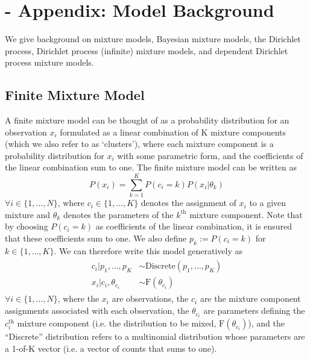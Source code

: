 \documentclass[twocolumn, final]{svjour3}
\begin{document}

\appendix

\newpage

\section{-  Appendix: Model Background}
\label{sec:modelbackground}

We give background on mixture models, Bayesian mixture models, the Dirichlet process, Dirichlet process (infinite) mixture models, and dependent Dirichlet process mixture models.


\subsection{Finite Mixture Model}
\label{sec:finitemixture}

A finite mixture model can be thought of as a probability distribution for an observation $x_{i}$ formulated as a linear combination of K mixture components (which we also refer to as `clusters'), where each mixture component is a probability distribution for $x_{i}$ with some parametric form, and the coefficients of the linear combination sum to one. The finite mixture model can be written as
\begin{equation}
P(x_{i}) = \sum_{k=1}^{K} P(c_{i} = k)P(x_{i}|\theta_{k})
\end{equation}
$\forall i \in \{ 1, \ldots, N \}$, where $c_{i} \in \{ 1, \ldots, K \}$ denotes the assignment of $x_{i}$ to a given mixture and $\theta_{k}$ denotes the parameters of the $k^{\text{th}}$ mixture component. Note that by choosing $P(c_{i} = k)$ as coefficients of the linear combination, it is ensured that these coefficients sum to one. We also define $p_{k} := P(c_{i} = k)$ for $k \in \{ 1, \ldots, K \} $. We can therefore write this model generatively as
\begin{align}
\begin{split}
  c_{i}|p_{1}, \ldots, p_{K}  &\sim  \text{Discrete}(p_{1}, \ldots, p_{K}) \\
  x_{i}|c_{i}, \theta_{c_{i}}  &\sim  \text{F}(\theta_{c_{i}})
\end{split}
\end{align}
$\forall i \in \{ 1, \ldots, N \}$, where the $x_{i}$ are observations, the $c_{i}$ are the mixture component assignments associated with each observation, the $\theta_{c_{i}}$ are parameters defining the $c_{i}^{\text{th}}$ mixture component (i.e. the distribution to be mixed, $\text{F}(\theta_{c_{i}})$), and the ``Discrete'' distribution refers to a multinomial distribution whose parameters are a 1-of-K vector (i.e. a vector of counts that sums to one).
\end{document}

